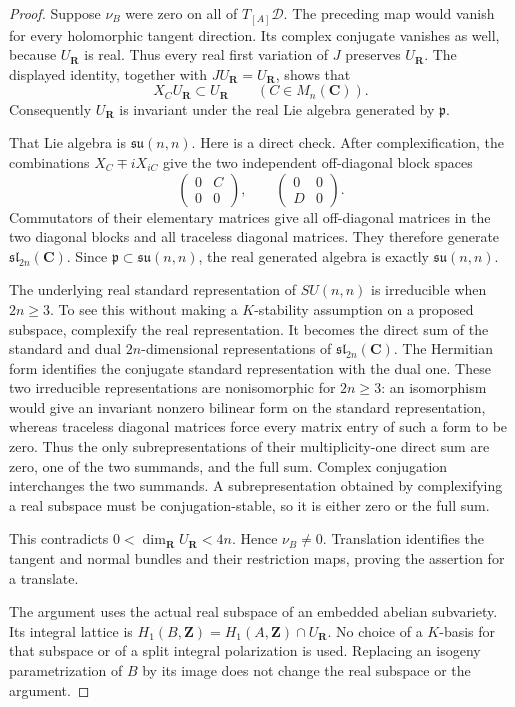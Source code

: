 \documentclass[11pt]{article}
\theoremstyle{definition}
\theoremstyle{remark}
\begin{document}
\begin{proof}
Suppose $\nu_B$ were zero on all of $T_{[A]}\mathcal D$.
The preceding map would vanish for every holomorphic tangent
direction.  Its complex conjugate vanishes as well, because
$U_{\mathbf R}$ is real.  Thus every real first variation of $J$
preserves $U_{\mathbf R}$.  The displayed identity, together with
$JU_{\mathbf R}=U_{\mathbf R}$, shows that
\[
 X_CU_{\mathbf R}\subset U_{\mathbf R}\qquad(C\in M_n(\mathbf C)).
\]
Consequently $U_{\mathbf R}$ is invariant under the real Lie algebra
generated by $\mathfrak p$.

That Lie algebra is $\mathfrak{su}(n,n)$.  Here is a direct check.
After complexification, the combinations $X_C\mp iX_{iC}$ give
the two independent off-diagonal block spaces
\[
 \begin{pmatrix}0&C\\0&0\end{pmatrix},\qquad
 \begin{pmatrix}0&0\\D&0\end{pmatrix}.
\]
Commutators of their elementary matrices give all off-diagonal
matrices in the two diagonal blocks and all traceless diagonal
matrices.  They therefore generate $\mathfrak{sl}_{2n}(\mathbf C)$.
Since $\mathfrak p\subset\mathfrak{su}(n,n)$, the real generated
algebra is exactly $\mathfrak{su}(n,n)$.

The underlying real standard representation of $SU(n,n)$ is
irreducible when $2n\geq3$.  To see this without making a
$K$-stability assumption on a proposed subspace, complexify the
real representation.  It becomes the direct sum of the standard
and dual $2n$-dimensional representations of
$\mathfrak{sl}_{2n}(\mathbf C)$.  The Hermitian form identifies
the conjugate standard representation with the dual one.  These
two irreducible representations are nonisomorphic for $2n\geq3$:
an isomorphism would give an invariant nonzero bilinear form on
the standard representation, whereas traceless diagonal matrices
force every matrix entry of such a form to be zero.  Thus the only
subrepresentations of their multiplicity-one direct sum are zero,
one of the two summands, and the full sum.  Complex conjugation
interchanges the two summands.  A subrepresentation obtained by
complexifying a real subspace must be conjugation-stable, so it
is either zero or the full sum.

This contradicts $0<\dim_{\mathbf R}U_{\mathbf R}<4n$.
Hence $\nu_B\ne0$.  Translation identifies the tangent and normal
bundles and their restriction maps, proving the assertion for a
translate.

The argument uses the actual real subspace of an embedded abelian
subvariety.  Its integral lattice is
$H_1(B,\mathbf Z)=H_1(A,\mathbf Z)\cap U_{\mathbf R}$.
No choice of a $K$-basis for that subspace or of a split integral
polarization is used.  Replacing an isogeny parametrization of $B$
by its image does not change the real subspace or the argument.
\end{proof}
\end{document}
